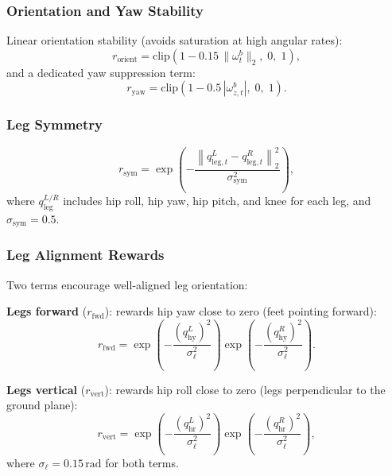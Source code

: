\documentclass[conference]{IEEEtran}
\begin{document}
\subsubsection{Orientation and Yaw Stability}
Linear orientation stability (avoids saturation at high angular rates):
\begin{equation}
r_{\mathrm{orient}} =
\mathrm{clip}\!\left(1 - 0.15\,\|\omega_t^b\|_2,\; 0,\; 1\right),
\label{eq:orient_reward}
\end{equation}
and a dedicated yaw suppression term:
\begin{equation}
r_{\mathrm{yaw}} =
\mathrm{clip}\!\left(1 - 0.5\,|\omega_{z,t}^b|,\; 0,\; 1\right).
\label{eq:yaw_reward}
\end{equation}

\subsubsection{Leg Symmetry}
\begin{equation}
r_{\mathrm{sym}} =
\exp\!\left(
-\frac{
\left\|
q_{\mathrm{leg},t}^L - q_{\mathrm{leg},t}^R
\right\|_2^2
}{\sigma_{\mathrm{sym}}^2}
\right),
\label{eq:symmetry_reward}
\end{equation}
where $q_{\mathrm{leg}}^{L/R}$ includes hip roll, hip yaw, hip pitch,
and knee for each leg, and $\sigma_{\mathrm{sym}} = 0.5$.

\subsubsection{Leg Alignment Rewards}
Two terms encourage well-aligned leg orientation:

\noindent\textbf{Legs forward} ($r_{\mathrm{fwd}}$):
rewards hip yaw close to zero (feet pointing forward):
\begin{equation}
r_{\mathrm{fwd}} =
\exp\!\left(-\frac{(q_{\mathrm{hy}}^L)^2}{\sigma_{\ell}^2}\right)
\exp\!\left(-\frac{(q_{\mathrm{hy}}^R)^2}{\sigma_{\ell}^2}\right).
\label{eq:legs_forward}
\end{equation}

\noindent\textbf{Legs vertical} ($r_{\mathrm{vert}}$):
rewards hip roll close to zero (legs perpendicular to the ground plane):
\begin{equation}
r_{\mathrm{vert}} =
\exp\!\left(-\frac{(q_{\mathrm{hr}}^L)^2}{\sigma_{\ell}^2}\right)
\exp\!\left(-\frac{(q_{\mathrm{hr}}^R)^2}{\sigma_{\ell}^2}\right),
\label{eq:legs_vertical}
\end{equation}
where $\sigma_{\ell} = 0.15\,\mathrm{rad}$ for both terms.
\end{document}
